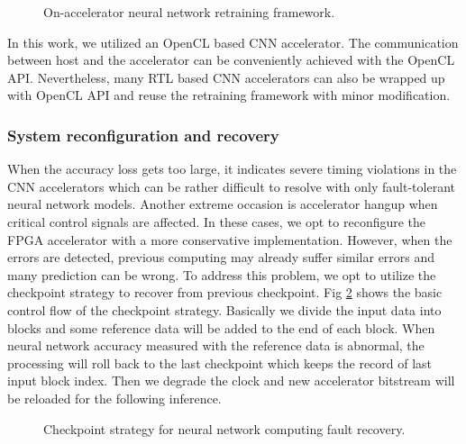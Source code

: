 \begin{figure}
    \caption{On-accelerator neural network retraining framework.}
\label{fig:retrain}
\vspace{-1em}
\end{figure}


In this work, we utilized an OpenCL based CNN accelerator. The communication between 
host and the accelerator can be conveniently achieved with the OpenCL API. 
Nevertheless, many RTL based CNN accelerators can also be wrapped up with 
OpenCL API and reuse the retraining framework with minor modification.

\subsubsection{System reconfiguration and recovery}
When the accuracy loss gets too large, it indicates severe timing 
violations in the CNN accelerators which can be rather difficult to resolve with 
only fault-tolerant neural network models. Another extreme occasion is 
accelerator hangup when critical control signals are affected. In these cases, we 
opt to reconfigure the FPGA accelerator with a more conservative implementation.
However, when the errors are detected, previous computing may already suffer 
similar errors and many prediction can be wrong. To address this problem, we opt to 
utilize the checkpoint strategy to recover from previous checkpoint. 
Fig \ref{fig:checkpoint} shows the basic control flow of the checkpoint strategy.
Basically we divide the input data into blocks and some reference data 
will be added to the end of each block. When neural network accuracy measured with 
the reference data is abnormal, the processing will roll back to the last checkpoint 
which keeps the record of last input block index. Then we degrade the clock and 
new accelerator bitstream will be reloaded for the following inference.

\begin{figure}
    \caption{Checkpoint strategy for neural network computing fault recovery.}
\label{fig:checkpoint}
\vspace{-1em}
\end{figure}


